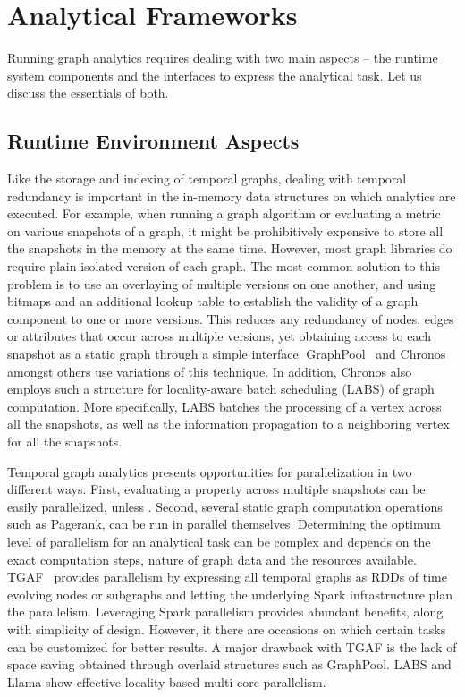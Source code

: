 \documentclass{svjour3}
\begin{document}
\section{Analytical Frameworks}

Running graph analytics requires dealing with two main aspects -- the runtime system components and the interfaces to express the analytical task. Let us discuss the essentials of both.

\subsection{Runtime Environment Aspects}

 Like the storage and indexing of temporal graphs, dealing with temporal redundancy is important in the in-memory data structures on which analytics are executed. For example, when running a graph algorithm or evaluating a metric on various snapshots of a graph, it might be prohibitively expensive to store all the snapshots in the memory at the same time. However, most graph libraries do require plain isolated version of each graph. The most common solution to this problem is to use an overlaying of multiple versions on one another, and using bitmaps and an additional lookup table to establish the validity of a graph component to one or more versions. This reduces any redundancy of nodes, edges or attributes that occur across multiple versions, yet obtaining access to each snapshot as a static graph through a simple interface. GraphPool~\cite{khurana2013efficient} and Chronos~\cite{han2014chronos} amongst others use variations of this technique. In addition, Chronos also employs such a structure for locality-aware batch scheduling (LABS) of graph computation. More specifically, LABS batches the processing of a vertex across all the snapshots, as well as the information propagation to a neighboring vertex for all the snapshots.

\vspace{2mm}

 Temporal graph analytics presents opportunities for parallelization in two different ways. First, evaluating a property across multiple snapshots can be easily parallelized, unless . Second, several static graph computation operations such as Pagerank, can be run in parallel themselves. Determining the optimum level of parallelism for an analytical task can be complex and depends on the exact computation steps, nature of graph data and the resources available. TGAF~\cite{khurana2016storing} provides parallelism by expressing all temporal graphs as RDDs of time evolving nodes or subgraphs and letting the underlying Spark infrastructure plan the parallelism. Leveraging Spark parallelism provides abundant benefits, along with simplicity of design. However, it there are occasions on which certain tasks can be customized for better results. A major drawback with TGAF is the lack of space saving obtained through overlaid structures such as GraphPool. LABS and Llama show effective locality-based multi-core parallelism.%
\end{document}
